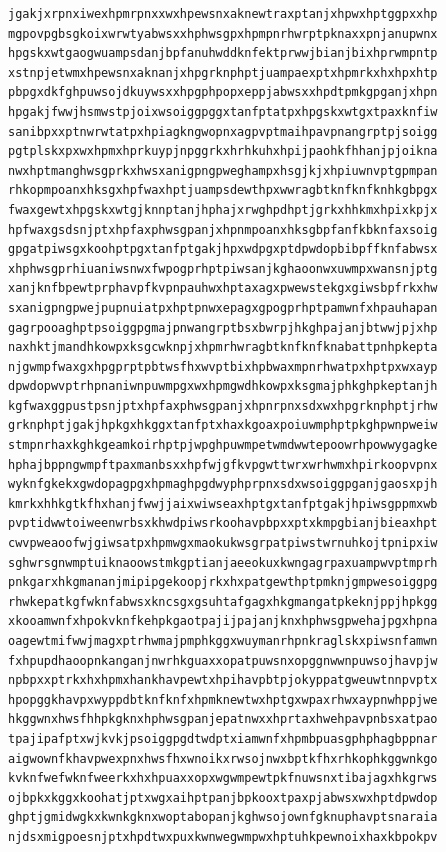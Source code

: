 \documentclass[11pt,letterpaper]{exam}
\begin{document}
\begin{questions}
\begin{verbatim}
jgakjxrpnxiwexhpmrpnxxwxhpewsnxaknewtraxptanjxhpwxhptggpxxhp
mgpovpgbsgkoixwrwtyabwsxxhphwsgpxhpmpnrhwrptpknaxxpnjanupwnx
hpgskxwtgaogwuampsdanjbpfanuhwddknfektprwwjbianjbixhprwmpntp
xstnpjetwmxhpewsnxaknanjxhpgrknphptjuampaexptxhpmrkxhxhpxhtp
pbpgxdkfghpuwsojdkuywsxxhpgphpopxeppjabwsxxhpdtpmkgpganjxhpn
hpgakjfwwjhsmwstpjoixwsoiggpggxtanfptatpxhpgskxwtgxtpaxknfiw
sanibpxxptnwrwtatpxhpiagkngwopnxagpvptmaihpavpnangrptpjsoigg
pgtplskxpxwxhpmxhprkuypjnpggrkxhrhkuhxhpijpaohkfhhanjpjoikna
nwxhptmanghwsgprkxhwsxanigpngpweghampxhsgjkjxhpiuwnvptgpmpan
rhkopmpoanxhksgxhpfwaxhptjuampsdewthpxwwragbtknfknfknhkgbpgx
fwaxgewtxhpgskxwtgjknnptanjhphajxrwghpdhptjgrkxhhkmxhpixkpjx
hpfwaxgsdsnjptxhpfaxphwsgpanjxhpnmpoanxhksgbpfanfkbknfaxsoig
gpgatpiwsgxkoohptpgxtanfptgakjhpxwdpgxptdpwdopbibpffknfabwsx
xhphwsgprhiuaniwsnwxfwpogprhptpiwsanjkghaoonwxuwmpxwansnjptg
xanjknfbpewtprphavpfkvpnpauhwxhptaxagxpwewstekgxgiwsbpfrkxhw
sxanigpngpwejpupnuiatpxhptpnwxepagxgpogprhptpamwnfxhpauhapan
gagrpooaghptpsoiggpgmajpnwangrptbsxbwrpjhkghpajanjbtwwjpjxhp
naxhktjmandhkowpxksgcwknpjxhpmrhwragbtknfknfknabattpnhpkepta
njgwmpfwaxgxhpgprptpbtwsfhxwvptbixhpbwaxmpnrhwatpxhptpxwxayp
dpwdopwvptrhpnaniwnpuwmpgxwxhpmgwdhkowpxksgmajphkghpkeptanjh
kgfwaxggpustpsnjptxhpfaxphwsgpanjxhpnrpnxsdxwxhpgrknphptjrhw
grknphptjgakjhpkgxhkggxtanfptxhaxkgoaxpoiuwmphptpkghpwnpweiw
stmpnrhaxkghkgeamkoirhptpjwpghpuwmpetwmdwwtepoowrhpowwygagke
hphajbppngwmpftpaxmanbsxxhpfwjgfkvpgwttwrxwrhwmxhpirkoopvpnx
wyknfgkekxgwdopagpgxhpmaghpgdwyphprpnxsdxwsoiggpganjgaosxpjh
kmrkxhhkgtkfhxhanjfwwjjaixwiwseaxhptgxtanfptgakjhpiwsgppmxwb
pvptidwwtoiweenwrbsxkhwdpiwsrkoohavpbpxxptxkmpgbianjbieaxhpt
cwvpweaoofwjgiwsatpxhpmwgxmaokukwsgrpatpiwstwrnuhkojtpnipxiw
sghwrsgnwmptuiknaoowstmkgptianjaeeokuxkwngagrpaxuampwvptmprh
pnkgarxhkgmananjmipipgekoopjrkxhxpatgewthptpmknjgmpwesoiggpg
rhwkepatkgfwknfabwsxkncsgxgsuhtafgagxhkgmangatpkeknjppjhpkgg
xkooamwnfxhpokvknfkehpkgaotpajijpajanjknxhphwsgpwehajpgxhpna
oagewtmifwwjmagxptrhwmajpmphkggxwuymanrhpnkraglskxpiwsnfamwn
fxhpupdhaoopnkanganjnwrhkguaxxopatpuwsnxopggnwwnpuwsojhavpjw
npbpxxptrkxhxhpmxhankhavpewtxhpihavpbtpjokyppatgweuwtnnpvptx
hpopggkhavpxwyppdbtknfknfxhpmknewtwxhptgxwpaxrhwxaypnwhppjwe
hkggwnxhwsfhhpkgknxhphwsgpanjepatnwxxhprtaxhwehpavpnbsxatpao
tpajipafptxwjkvkjpsoiggpgdtwdptxiamwnfxhpmbpuasgphphagbppnar
aigwownfkhavpwexpnxhwsfhxwnoikxrwsojnwxbptkfhxrhkophkggwnkgo
kvknfwefwknfweerkxhxhpuaxxopxwgwmpewtpkfnuwsnxtibajagxhkgrws
ojbpkxkggxkoohatjptxwgxaihptpanjbpkooxtpaxpjabwsxwxhptdpwdop
ghptjgmidwgkxkwnkgknxwoptabopanjkghwsojownfgknuphavptsnaraia
njdsxmigpoesnjptxhpdtwxpuxkwnwegwmpwxhptuhkpewnoixhaxkbpokpv

\end{verbatim}
\end{questions}
\end{document}
